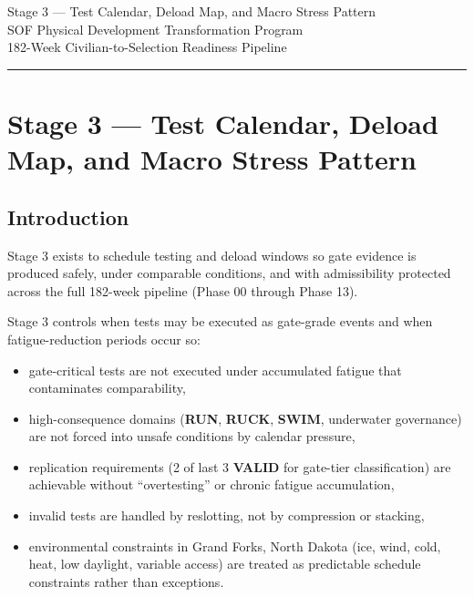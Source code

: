 \documentclass[10pt]{article}
\newcommand{\TitleLine}{\textcolor{StageBlue}{\rule{0.98\linewidth}{0.95pt}}}
\begin{document}
\begin{tcolorbox}
\begin{center}
Stage 3 — Test Calendar, Deload Map, and Macro Stress Pattern\\[0.35em]
SOF Physical Development Transformation Program\\[0.25em]
182-Week Civilian-to-Selection Readiness Pipeline\\[0.65em]
\TitleLine
\end{center}
\end{tcolorbox}

\vspace{0.35em}

\section*{Stage 3 — Test Calendar, Deload Map, and Macro Stress Pattern}
{}

\subsection*{Introduction}
{}

Stage 3 exists to schedule testing and deload windows so gate evidence is produced safely, under comparable conditions, and with admissibility protected across the full 182-week pipeline (Phase 00 through Phase 13).

Stage 3 controls when tests may be executed as gate-grade events and when fatigue-reduction periods occur so:

\begin{itemize}
\item gate-critical tests are not executed under accumulated fatigue that contaminates comparability,
\item high-consequence domains (\textbf{RUN}, \textbf{RUCK}, \textbf{SWIM}, underwater governance) are not forced into unsafe conditions by calendar pressure,
\item replication requirements (2 of last 3 \textbf{VALID} for gate-tier classification) are achievable without “overtesting” or chronic fatigue accumulation,
\item invalid tests are handled by reslotting, not by compression or stacking,
\item environmental constraints in Grand Forks, North Dakota (ice, wind, cold, heat, low daylight, variable access) are treated as predictable schedule constraints rather than exceptions.
\end{itemize}
\end{document}
